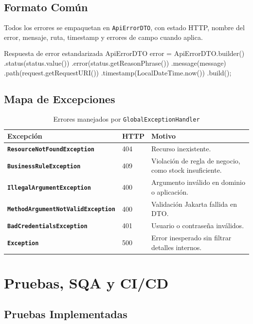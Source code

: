 \documentclass[11pt,oneside]{report}
\begin{document}
\section{Formato Común}

Todos los errores se empaquetan en \texttt{ApiErrorDTO}, con estado HTTP, nombre del error, mensaje, ruta, timestamp y errores de campo cuando aplica.

\begin{codewindow}[language=Java]{Respuesta de error estandarizada}
ApiErrorDTO error = ApiErrorDTO.builder()
        .status(status.value())
        .error(status.getReasonPhrase())
        .message(message)
        .path(request.getRequestURI())
        .timestamp(LocalDateTime.now())
        .build();
\end{codewindow}

\section{Mapa de Excepciones}

\begin{table}[h!]
\centering
\caption{Errores manejados por \texttt{GlobalExceptionHandler}}
\begin{tabularx}{\textwidth}{>{\bfseries}p{4.4cm} p{2.2cm} X}
\toprule
Excepción & HTTP & Motivo \\
\midrule
\texttt{ResourceNotFoundException} & 404 & Recurso inexistente.\\
\texttt{BusinessRuleException} & 409 & Violación de regla de negocio, como stock insuficiente.\\
\texttt{IllegalArgumentException} & 400 & Argumento inválido en dominio o aplicación.\\
\texttt{MethodArgumentNotValidException} & 400 & Validación Jakarta fallida en DTO.\\
\texttt{BadCredentialsException} & 401 & Usuario o contraseña inválidos.\\
\texttt{Exception} & 500 & Error inesperado sin filtrar detalles internos.\\
\bottomrule
\end{tabularx}
\end{table}

\chapter{Pruebas, SQA y CI/CD}

\section{Pruebas Implementadas}
\end{document}
